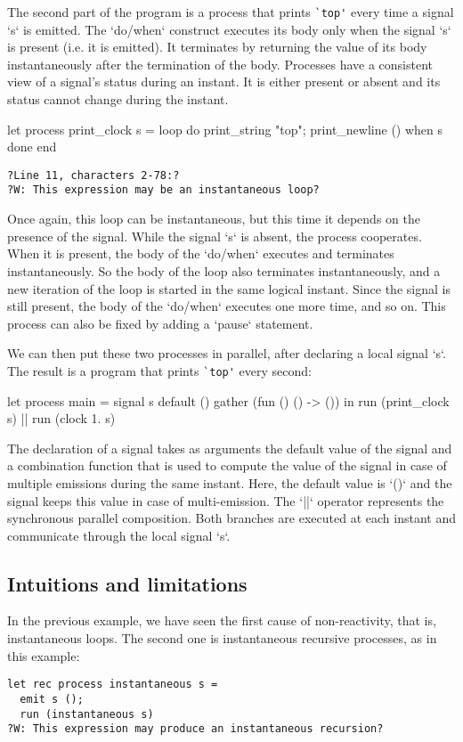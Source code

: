 \documentclass[9pt]{sigplanconf}
\begin{document}
The second part of the program is a process that prints \verb+`top'+ every time a signal `s` is emitted. 
The `do/when` construct executes its body only when the signal `s` is present (i.e. it is emitted). It terminates by returning the value of its body instantaneously after the termination of the body. Processes have a consistent view of a signal's status during an instant. It is either present or absent and its status cannot change during the instant.
%
\begin{rmlcl}[10]
let process print_clock s =
  loop
    do
      print_string "top"; print_newline ()
    when s done
  end
\end{rmlcl}
\begin{lstlisting}
?Line 11, characters 2-78:?
?W: This expression may be an instantaneous loop?
\end{lstlisting}
%
Once again, this loop can be instantaneous, but this time it depends on the presence of the signal. While the signal `s` is absent, the process cooperates. When it is present, the body of the `do/when` executes and terminates instantaneously. So the body of the loop also terminates instantaneously, and a new iteration of the loop is started in the same logical instant. Since the signal is still present, the body of the `do/when` executes one more time, and so on. This process can also be fixed by adding a `pause` statement.

We can then put these two processes in parallel, after declaring a local signal `s`. The result is a program that prints \verb+`top'+ every second:
\begin{rmlcl}[17]
let process main =
  signal s default () gather (fun () () -> ()) in
  run (print_clock s) || run (clock 1. s)
\end{rmlcl}
The declaration of a signal takes as arguments the default value of the signal and a combination function that is used to compute the value of the signal in case of multiple emissions during the same instant. Here, the default value is `()` and the signal keeps this value in case of multi-emission. The `||` operator represents the synchronous parallel composition. Both branches are executed at each instant and communicate through the local signal `s`.

\subsection{Intuitions and limitations}
\label{sec:intuition}

In the previous example, we have seen the first cause of non-reactivity, that is, instantaneous loops. The second one is instantaneous recursive processes, as in this example:
\begin{lstlisting}
let rec process instantaneous s =
  emit s ();
  run (instantaneous s)
?W: This expression may produce an instantaneous recursion?
\end{lstlisting}
\end{document}
